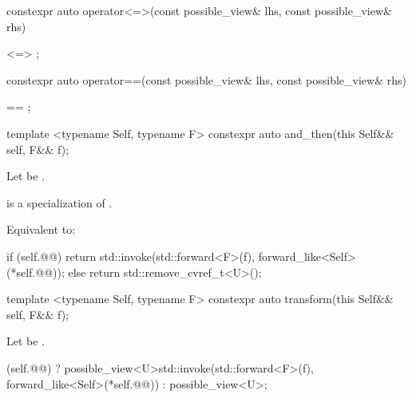 \begin{itemdecl}
constexpr auto operator<=>(const possible_view& lhs, const possible_view& rhs)
\end{itemdecl}

\begin{itemdescr}
\pnum{}
\returns {} <=> ;
\end{itemdescr}

\begin{itemdecl}
constexpr auto operator==(const possible_view& lhs, const possible_view& rhs)
\end{itemdecl}

\begin{itemdescr}
\pnum{}
\returns {} == ;
\end{itemdescr}

\begin{itemdecl}
  template <typename Self, typename F>
  constexpr auto and_then(this Self&& self, F&& f);
\end{itemdecl}

\begin{itemdescr}
\pnum
Let  be .

\pnum
\mandates
{} is a specialization of .

\pnum{}
\effects{}
Equivalent to:

\begin{codeblock}
  if (self.@@) {
    return std::invoke(std::forward<F>(f),
                      forward_like<Self>(*self.@@));
  } else {
    return std::remove_cvref_t<U>();
  }
\end{codeblock}
\end{itemdescr}


\begin{itemdecl}
  template <typename Self, typename F>
  constexpr auto transform(this Self&& self, F&& f);
\end{itemdecl}

\begin{itemdescr}
\pnum
Let  be .

\pnum{}
\returns
\begin{codeblock}
  (self.@@)
  ? possible_view<U>{std::invoke(std::forward<F>(f),
                              forward_like<Self>(*self.@@))}
  : possible_view<U>{};
\end{codeblock}
\end{itemdescr}


